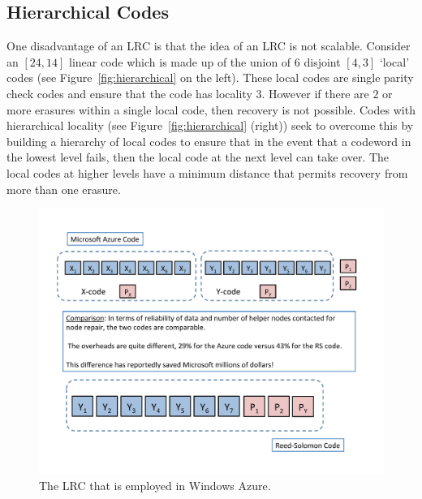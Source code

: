 \begin{multicols}{2}
\subsection{Hierarchical Codes} 	

One disadvantage of an LRC is that the idea of an LRC is not scalable. Consider an $[24,14]$ linear code which is made up of the union of $6$ disjoint $[4,3]$ `local' codes (see Figure~\ref{fig:hierarchical} on the left).  These local codes are single parity check codes and ensure that the code has locality $3$.  However if there are $2$ or more erasures within a single local code, then recovery is not possible.  Codes with hierarchical locality \cite{SasAgaKum_loc} (see Figure~\ref{fig:hierarchical} (right)) seek to overcome this by building a hierarchy of local codes to ensure that in the event that a codeword in the lowest level fails, then the local code at the next level can take over.  The local codes at higher levels have a minimum distance that permits recovery from more than one erasure.
\end{multicols}

	\begin{figure}[h!]
		\centering
		\includegraphics[scale=.52]{src/Figures/chap4/Azure}  
		\caption{The LRC that is employed in Windows Azure.}  \label{fig:Azure}    
	\end{figure}      

\medskip

